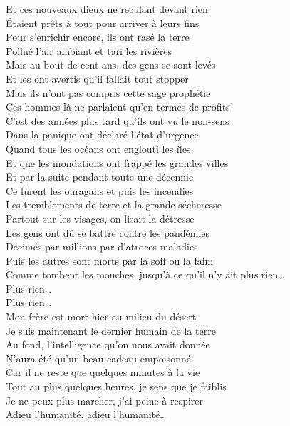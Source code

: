 \documentclass{novel}
\begin{document}
\begin{multicols}{2}
Et ces nouveaux dieux ne reculant devant rien \\
Étaient prêts à tout pour arriver à leurs fins \\
Pour s'enrichir encore, ils ont rasé la terre \\
Pollué l'air ambiant et tari les rivières \\

Mais au bout de cent ans, des gens se sont levés \\
Et les ont avertis qu'il fallait tout stopper \\
Mais ils n'ont pas compris cette sage prophétie \\
Ces hommes-là ne parlaient qu'en termes de profits \\

C'est des années plus tard qu'ils ont vu le non-sens \\
Dans la panique ont déclaré l'état d'urgence \\
Quand tous les océans ont englouti les îles \\
Et que les inondations ont frappé les grandes villes \\

Et par la suite pendant toute une décennie \\
Ce furent les ouragans et puis les incendies \\
Les tremblements de terre et la grande sécheresse \\
Partout sur les visages, on lisait la détresse \\

Les gens ont dû se battre contre les pandémies \\
Décimés par millions par d'atroces maladies \\
Puis les autres sont morts par la soif ou la faim \\
Comme tombent les mouches, jusqu'à ce qu'il n'y ait plus rien… \\
Plus rien… \\
Plus rien… \\

Mon frère est mort hier au milieu du désert \\
Je suis maintenant le dernier humain de la terre \\
Au fond, l'intelligence qu'on nous avait donnée \\
N'aura été qu'un beau cadeau empoisonné \\

Car il ne reste que quelques minutes à la vie \\
Tout au plus quelques heures, je sens que je faiblis \\
Je ne peux plus marcher, j'ai peine à respirer \\
Adieu l'humanité, adieu l'humanité…
\end{multicols}
\end{document}
